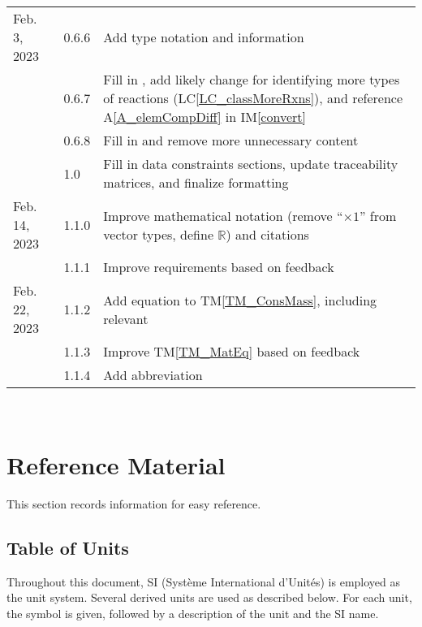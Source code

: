 \documentclass[12pt]{article}
\newcommand{\tmref}[1]{TM\ref{#1}}
\newcommand{\aref}[1]{A\ref{#1}}
\newcommand{\iref}[1]{IM\ref{#1}}
\newcommand{\lcref}[1]{LC\ref{#1}}
\begin{document}
\begin{tabularx}{\textwidth}{p{2.5cm}p{1.5cm}X}
  Feb. 3, 2023        & 0.6.6         & Add type notation and information                                    \\
                      & 0.6.7         & Fill in \nameref{sec_UCs}, add likely change for identifying
  more types of reactions (\lcref{LC_classMoreRxns}), and reference \aref{A_elemCompDiff} in \iref{convert}  \\
                      & 0.6.8         & Fill in \nameref{sec_traceMats} and remove more unnecessary content  \\
                      & 1.0           & Fill in data constraints sections, update traceability matrices, and
  finalize formatting                                                                                        \\
  Feb. 14, 2023       & 1.1.0         & Improve mathematical notation
  (remove ``$\times 1$'' from vector types, define $\mathbb{R}$) and citations                               \\
                      & 1.1.1         & Improve requirements based on feedback                               \\
  Feb. 22, 2023       & 1.1.2         & Add equation to \tmref{TM_ConsMass}, including relevant
  \nameref{sec_datatypes}                                                                                    \\
                      & 1.1.3         & Improve \tmref{TM_MatEq} based on feedback                           \\
                      & 1.1.4         & Add \progname{} abbreviation                                         \\
  \bottomrule
\end{tabularx}

~\newpage

\section{Reference Material} \label{sec_refMat}

This section records information for easy reference.

\subsection{Table of Units} \label{sec_ToU}

Throughout this document, SI (Syst\`{e}me International d'Unit\'{e}s) is employed
as the unit system.
Several derived units are
used as described below.  For each unit, the symbol is given, followed by a
description of the unit and the SI name.
~\newline
\end{document}
